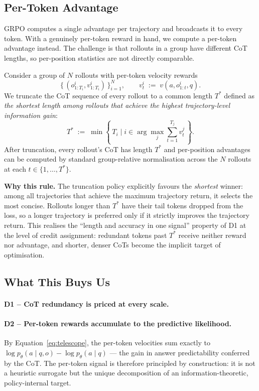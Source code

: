 \documentclass{article}
\begin{document}
\subsection{Per-Token Advantage}
\label{subsec:advantage}

GRPO computes a single advantage per trajectory and broadcasts it to every
token. With a genuinely per-token reward in hand, we compute a per-token
advantage instead. The challenge is that rollouts in a group have different
CoT lengths, so per-position statistics are not directly comparable.

Consider a group of \(N\) rollouts with per-token velocity rewards
\[
\bigl\{\,
(o^{i}_{1:T_i}, v^{i}_{1:T_i}) \,\bigr\}_{i=1}^{N},
\qquad
v^{i}_{t} \;:=\; v(a, o^{i}_{1:t}, q).
\]
We truncate the CoT sequence of every rollout to a common length \(T^{*}\) defined as
\emph{the shortest length among rollouts that achieve the highest
trajectory-level information gain}:
\begin{equation}
T^{*}
\;:=\;
\min \!\left\{\, T_i \;\Big|\; i \in \arg\max_{j} \sum_{t=1}^{T_j} v^{j}_{t} \,\right\}.
\label{eq:tstar}
\end{equation}
After truncation, every rollout's CoT has length \(T^{*}\) and per-position
advantages can be computed by standard group-relative normalisation across
the \(N\) rollouts at each \(t \in \{1, \dots, T^{*}\}\).

\textbf{Why this rule.} The truncation policy explicitly favours the
\emph{shortest} winner: among all trajectories that achieve the maximum
trajectory return, it selects the most concise. Rollouts longer than
\(T^{*}\) have their tail tokens dropped from the loss, so a longer
trajectory is preferred only if it strictly improves the trajectory return.
This realises the ``length and accuracy in one signal'' property of D1 at
the level of credit assignment: redundant tokens past \(T^{*}\) receive
neither reward nor advantage, and shorter, denser CoTs become the implicit
target of optimisation.

\subsection{What This Buys Us}
\label{subsec:buys}

\paragraph{D1 -- CoT redundancy is priced at every scale.}

\paragraph{D2 -- Per-token rewards accumulate to the predictive
likelihood.} By Equation~\ref{eq:telescope}, the per-token velocities
sum exactly to \(\log p_\theta(a \mid q, o) - \log p_\theta(a \mid q)\)
--- the gain in answer predictability conferred by the CoT. The
per-token signal is therefore principled by construction: it is not a
heuristic surrogate but the unique decomposition of an
information-theoretic, policy-internal target.
\end{document}

